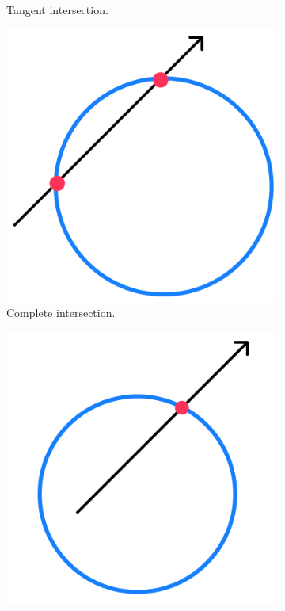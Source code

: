 \documentclass[a4paper,11pt,oneside]{article}
\begin{document}
\begin{figure}[ht]
\begin{subfigure}[b]{0.4\textwidth}
		\caption{Tangent intersection.}
		\label{sec3.1:tangent-intersection}
	\end{subfigure}
	\medskip
	\begin{subfigure}[b]{0.4\textwidth}
		\centering
		\includegraphics[width=\linewidth]{section3/3.1/intersection-in-out.png}
		\caption{Complete intersection.}
		\label{sec3.1:complete-intersection}
	\end{subfigure}
	\hfill
	\begin{subfigure}[b]{0.4\textwidth}
		\centering
		\includegraphics[width=\linewidth]{section3/3.1/intersection-out.png}

\end{subfigure}
\end{figure}
\end{document}
